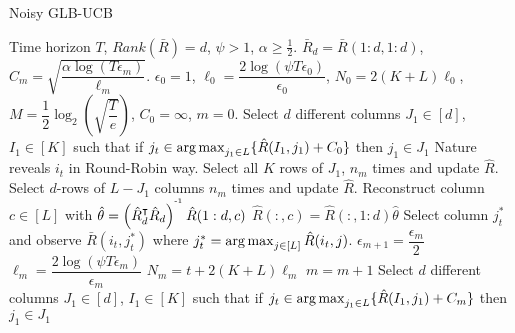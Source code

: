 \begin{algorithm}[!th]
\caption{Noisy GLB-UCB}
\label{alg:NSGLB}
\begin{algorithmic}
 Time horizon $T$, $Rank(\bar{R}) = d$, $\psi >1$, $\alpha\geq\frac{1}{2}$.
 $\bar{R}_d = \bar{R}(1:d,1:d)$, $C_m = \sqrt{\dfrac{\alpha\log(T\epsilon_m)}{\ell_m}}$.
 $\epsilon_0 = 1$, $\ell_0 = \dfrac{2\log(\psi T\epsilon_0)}{\epsilon_0}$, $N_0 = 2(K+L)\ell_0$, $M=\dfrac{1}{2}\log_2\left(\sqrt{\dfrac{T}{e}}\right)$, $C_0 = \infty$, $m=0$.
\State Select $d$ different columns $J_1\in [d]$, $I_1\in [K]$ such that if $j_t\in \mathop{\rm arg\,max}_{j_1\in L}\lbrace \hat{R}(I_1,j_1) + C_0\rbrace$ then $j_1\in J_1$
\State Nature reveals $i_t$ in Round-Robin way.
\Explore
\State Select all $K$ rows of $J_1$, $n_m$ times and update $\hat{R}$.
\State Select $d$-rows of $L - J_1$ columns $n_m$ times and update $\hat{R}$.
\EndExplore
\ColRec
\State Reconstruct column $c\in[L]$ with $\hat{\theta} = \left(\hat{R}_d^{\intercal}\hat{R}_d\right)^{^{\text{-}1}}\hat{R}(1:d,c) $
\State $\hat{R}(:,c) =  \hat{R}(:,1:d)\hat{\theta}$
\EndColRec
\State {}
\Exploit
\State Select column $j_t^*$ and observe $\bar{R}(i_t,j_t^*)$ where $j_t^* = \mathop{\rm arg\,max}_{j\in[L]} {\hat{R}(i_t,j)}$.
\EndExploit
\EndIf
\State {}
\ResParam
\State $\epsilon_{m+1} = \dfrac{\epsilon_m}{2}$
\State $\ell_m = \dfrac{2\log(\psi T\epsilon_m)}{\epsilon_m}$
\State $N_m = t +  2(K+L)\ell_m$
\State $m = m + 1$
\State Select $d$ different columns $J_1\in [d]$, $I_1\in [K]$ such that if $j_t\in \mathop{\rm arg\,max}_{j_1\in L}\lbrace \hat{R}(I_1,j_1) + C_m\rbrace$ then $j_1\in J_1$
\EndResParam
\EndIf
\EndFor
\end{algorithmic}
\end{algorithm}
